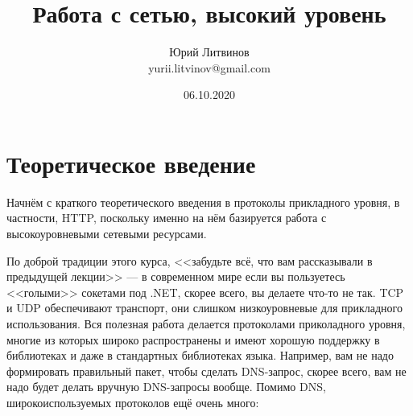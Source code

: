 \documentclass[a5paper]{article}
\title{Работа с сетью, высокий уровень}
\author{Юрий Литвинов\\\small{yurii.litvinov@gmail.com}}
\date{06.10.2020}
\begin{document}
\maketitle
\thispagestyle{empty}

\section{Теоретическое введение}

Начнём с краткого теоретического введения в протоколы прикладного уровня, в частности, HTTP, поскольку именно на нём базируется работа с высокоуровневыми сетевыми ресурсами.

По доброй традиции этого курса, <<забудьте всё, что вам рассказывали в предыдущей лекции>> --- в современном мире если вы пользуетесь <<голыми>> сокетами под .NET, скорее всего, вы делаете что-то не так. TCP и UDP обеспечивают транспорт, они слишком низкоуровневые для прикладного использования. Вся полезная работа делается протоколами приколадного уровня, многие из которых широко распространены и имеют хорошую поддержку в библиотеках и даже в стандартных библиотеках языка. Например, вам не надо формировать правильный пакет, чтобы сделать DNS-запрос, скорее всего, вам не надо будет делать вручную DNS-запросы вообще. Помимо DNS, широкоиспользуемых протоколов ещё очень много:
\end{document}
